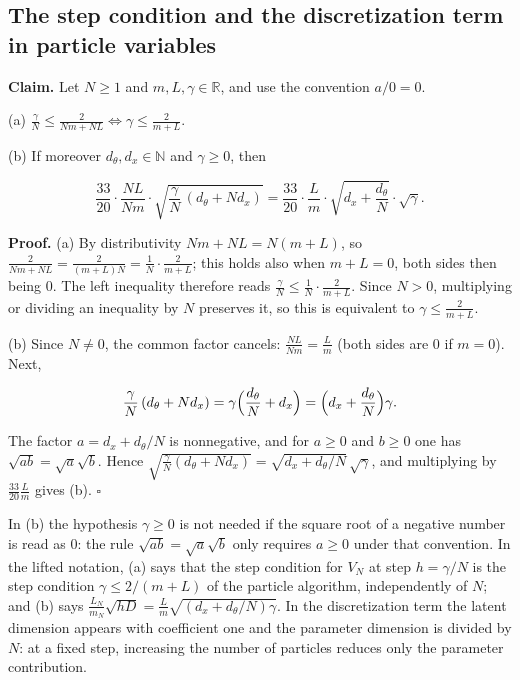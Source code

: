 \documentclass[11pt,a4paper]{report}
\begin{document}
\subsection{\texorpdfstring{The step condition and the discretization term in particle variables}{The step condition and the discretization term in particle variables}}
\label{report-step-IPLA-Scaling-lean-1}


\textbf{Claim.} Let \(N\ge1\) and \(m,L,\gamma\in\mathbb R\), and use the convention \(a/0=0\).




(a) \(\displaystyle\frac\gamma N\le\frac2{Nm+NL}\iff\gamma\le\frac2{m+L}\).




(b) If moreover \(d_\theta,d_x\in\mathbb N\) and \(\gamma\ge0\), then


\[\frac{33}{20}\cdot\frac{NL}{Nm}\cdot\sqrt{\frac\gamma N\,(d_\theta+Nd_x)}=\frac{33}{20}\cdot\frac Lm\cdot\sqrt{d_x+\frac{d_\theta}N}\cdot\sqrt\gamma .\]


\textbf{Proof.} (a) By distributivity \(Nm+NL=N(m+L)\), so \(\frac2{Nm+NL}=\frac2{(m+L)N}=\frac1N\cdot\frac2{m+L}\); this holds also when \(m+L=0\), both sides then being \(0\). The left inequality therefore reads \(\frac\gamma N\le\frac1N\cdot\frac2{m+L}\). Since \(N>0\), multiplying or dividing an inequality by \(N\) preserves it, so this is equivalent to \(\gamma\le\frac2{m+L}\).




(b) Since \(N\ne0\), the common factor cancels: \(\frac{NL}{Nm}=\frac Lm\) (both sides are \(0\) if \(m=0\)). Next,


\[\frac\gamma N\,(d_\theta+Nd_x)=\gamma\Bigl(\frac{d_\theta}N+d_x\Bigr)=\Bigl(d_x+\frac{d_\theta}N\Bigr)\gamma .\]


The factor \(a=d_x+d_\theta/N\) is nonnegative, and for \(a\ge0\) and \(b\ge0\) one has \(\sqrt{ab}=\sqrt a\sqrt b\). Hence \(\sqrt{\frac\gamma N(d_\theta+Nd_x)}=\sqrt{d_x+d_\theta/N}\,\sqrt\gamma\), and multiplying by \(\frac{33}{20}\frac Lm\) gives (b). \(\square\)




In (b) the hypothesis \(\gamma\ge0\) is not needed if the square root of a negative number is read as \(0\): the rule \(\sqrt{ab}=\sqrt a\sqrt b\) only requires \(a\ge0\) under that convention. In the lifted notation, (a) says that the step condition for \(V_N\) at step \(h=\gamma/N\) is the step condition \(\gamma\le2/(m+L)\) of the particle algorithm, independently of \(N\); and (b) says \(\frac{L_N}{m_N}\sqrt{hD}=\frac Lm\sqrt{(d_x+d_\theta/N)\gamma}\). In the discretization term the latent dimension appears with coefficient one and the parameter dimension is divided by \(N\): at a fixed step, increasing the number of particles reduces only the parameter contribution.
\end{document}

